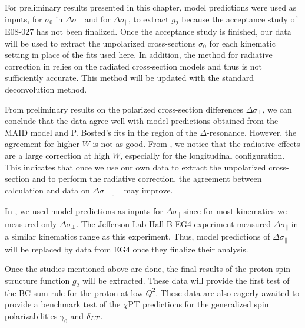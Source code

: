 For preliminary results presented in this chapter, model predictions were used as inputs, for $\sigma_0$ in $\Delta\sigma_\perp$ and for $\Delta\sigma_\parallel$, to extract $g_2$ because the acceptance study of E08-027 has not been finalized. Once the acceptance study is finished, our data will be used to extract the unpolarized cross-sections $\sigma_0$ for each kinematic setting in place of the fits used here. In addition, the method for radiative correction in  relies on the radiated cross-section models and thus is not sufficiently accurate. This method will be updated with the standard deconvolution method.

From preliminary results on the polarized cross-section differences $\Delta\sigma_\perp$, we can conclude that the data agree well with model predictions obtained from the MAID model and P. Bosted's fits in the region of the $\Delta$-resonance. However, the agreement for higher $W$ is not as good. From , we notice that the radiative effects are a large correction at high $W$, especially for the longitudinal configuration. This indicates that once we use our own data to extract the unpolarized cross-section and to perform the radiative correction, the agreement between calculation and data on $\Delta\sigma_{\perp,\parallel}$ may improve.

In , we used model predictions as inputs for $\Delta\sigma_{\parallel}$ since for most kinematics we measured only $\Delta\sigma_{\perp}$. The Jefferson Lab Hall B EG4 experiment measured $\Delta\sigma_{\parallel}$ in a similar kinematics range as this experiment. Thus, model predictions of $\Delta\sigma_{\parallel}$ will be replaced by data from EG4 once they finalize their analysis.

Once the studies mentioned above are done, the final results of the proton spin structure function $g_2$ will be extracted. These data will provide the first test of the BC sum rule for the proton at low $Q^2$. These data are also eagerly awaited to provide a benchmark test of the $\chi$PT predictions for the generalized spin polarizabilities $\gamma_0$ and $\delta_{LT}$.

